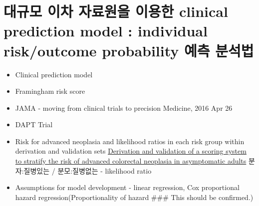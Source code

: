 \documentclass[]{book}
\providecommand{\tightlist}{%
  \setlength{\itemsep}{0pt}\setlength{\parskip}{0pt}}
\begin{document}
\section{대규모 이차 자료원을 이용한 clinical prediction model :
individual risk/outcome probability 예측
분석법}\label{----clinical-prediction-model-individual-riskoutcome-probability--}

\begin{itemize}
\tightlist
\item
  Clinical prediction model
\item
  Framingham risk score
\item
  JAMA - moving from clinical trials to precision Medicine, 2016 Apr 26
\item
  DAPT Trial
\item
  Risk for advanced neoplasia and likelihood ratios in each risk group
  within derivation and validation sets
  \href{http://www.ncbi.nlm.nih.gov/pmc/articles/PMC4840411/\#!po=38.6364}{Derivation
  and validation of a scoring system to stratify the risk of advanced
  colorectal neoplasia in asymptomatic adults} 분자:질병있는 /
  분모:질병없는 - likelihood ratio
\item
  Assumptions for model development - linear regression, Cox
  proportional hazard regression(Proportionality of hazard \#\#\# This
  should be confirmed.)
\end{itemize}
\end{document}
